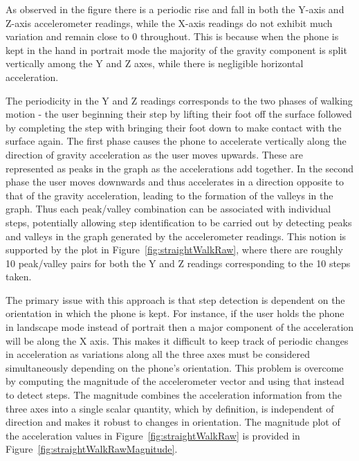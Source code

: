 \documentclass[12pt,a4paper,notitlepage]{report}
\begin{document}
As observed in the figure there is a periodic rise and fall in both the Y-axis and Z-axis accelerometer readings, while the X-axis readings do not exhibit much variation and remain close to 0 throughout. This is because when the phone is kept in the hand in portrait mode the majority of the gravity component is split vertically among the Y and Z axes, while there is negligible horizontal acceleration.

The periodicity in the Y and Z readings corresponds to the two phases of walking motion - the user beginning their step by lifting their foot off the surface followed by completing the step with bringing their foot down to make contact with the surface again. The first phase causes the phone to accelerate vertically along the direction of gravity acceleration as the user moves upwards. These are represented as peaks in the graph as the accelerations add together. In the second phase the user moves downwards and thus accelerates in a direction opposite to that of the gravity acceleration, leading to the formation of the valleys in the graph. Thus each peak/valley combination can be associated with individual steps, potentially allowing step identification to be carried out by detecting peaks and valleys in the graph generated by the accelerometer readings. This notion is supported by the plot in Figure~\ref{fig:straightWalkRaw}, where there are roughly 10 peak/valley pairs for both the Y and Z readings corresponding to the 10 steps taken.   

The primary issue with this approach is that step detection is dependent on the orientation in which the phone is kept. For instance, if the user holds the phone in landscape mode instead of portrait then a major component of the acceleration will  be along the X axis. This makes it difficult to keep track of periodic changes in acceleration as variations along all the three axes must be considered simultaneously depending on the phone's orientation. This problem is overcome by computing the magnitude of the accelerometer vector and using that instead to detect steps. The magnitude combines the acceleration information from the three axes into a single scalar quantity, which by definition, is independent of direction and makes it robust to changes in orientation. The magnitude plot of the acceleration values in Figure~\ref{fig:straightWalkRaw} is provided in Figure~\ref{fig:straightWalkRawMagnitude}. 
\end{document}
